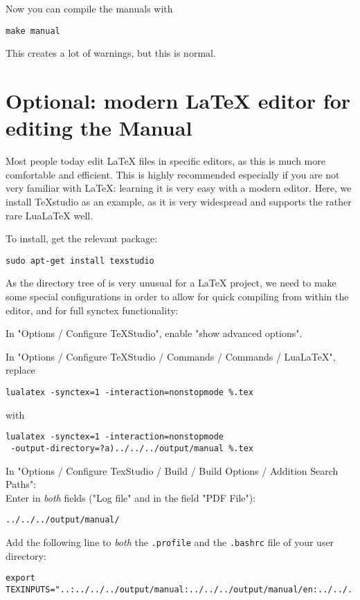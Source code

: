 Now you can compile the manuals with 

\begin{verbatim}
make manual
\end{verbatim}

This creates a lot of warnings, but this is normal.

\section{Optional: modern LaTeX editor for editing the Manual}
Most people today edit LaTeX files in specific editors, as this is much more comfortable and efficient. This is highly recommended especially if you are not very familiar with LaTeX: learning it is very easy with a modern editor. Here, we install TeXstudio as an example, as it is very widespread and supports the rather rare LuaLaTeX well.

To install, get the relevant package:

\begin{verbatim}
sudo apt-get install texstudio
\end{verbatim}

As the directory tree of \xc is very unusual for a LaTeX project, we need to make some special configurations in order to allow for quick compiling from within the editor, and for full synctex functionality:

In "Options / Configure TeXStudio", enable "show advanced options".

In "Options / Configure TeXStudio / Commands / Commands / LuaLaTeX", replace
\begin{verbatim}
lualatex -synctex=1 -interaction=nonstopmode %.tex
\end{verbatim}
with
\begin{verbatim}
lualatex -synctex=1 -interaction=nonstopmode
 -output-directory=?a)../../../output/manual %.tex
\end{verbatim}

In "Options / Configure TexStudio / Build / Build Options / Addition Search Paths":\\
Enter in \emph{both} fields ("Log file" and in the field "PDF File"):
\begin{verbatim}
../../../output/manual/
\end{verbatim}


Add the following line to \emph{both} the \texttt{.profile} and the \texttt{.bashrc} file of your user directory:
\begin{maxipage}
\begin{verbatim}
export TEXINPUTS="..:../../../output/manual:../../../output/manual/en:../../..:"
\end{verbatim}
\end{maxipage}


